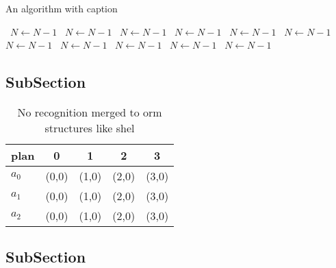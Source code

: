 \documentclass[a4paper]{article}
\begin{document}
\begin{algorithm}
\caption{An algorithm with caption}
\begin{algorithmic}
\    \State $N \gets N - 1$
\    \State $N \gets N - 1$
\    \State $N \gets N - 1$
\    \State $N \gets N - 1$
\    \State $N \gets N - 1$
\    \State $N \gets N - 1$
\    \State $N \gets N - 1$
\    \State $N \gets N - 1$
\    \State $N \gets N - 1$
\    \State $N \gets N - 1$
\    \State $N \gets N - 1$
\EndWhile
\end{algorithmic}
\end{algorithm}

\subsection{SubSection}

\begin{table}
\begin{adjustbox}{width=0.6\columnwidth}
\begin{tabular}{|l|l|l|l|l|}
\hline
\textbf{plan} & \multicolumn{1}{c|}{\textbf{0}} & \multicolumn{1}{c|}{\textbf{1}} & \multicolumn{1}{c|}{\textbf{2}} & \multicolumn{1}{c|}{\textbf{3}} \\ \hline
\textbf{$a_0$}  & (0,0) & (1,0) & (2,0) & (3,0) \\ \hline
\textbf{$a_1$}  & (0,0) & (1,0) & (2,0) & (3,0) \\ \hline
\textbf{$a_2$}  & (0,0) & (1,0) & (2,0) & (3,0) \\ \hline
\end{tabular}
\end{adjustbox}
\caption{No recognition merged to orm structures like shel
}
\end{table}

\subsection{SubSection}
\end{document}
